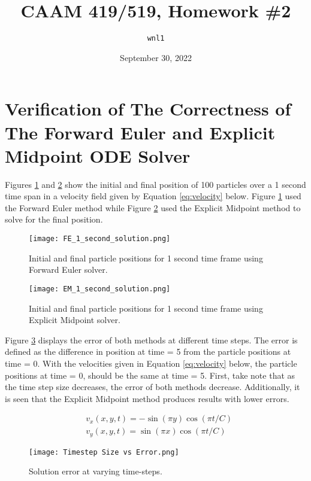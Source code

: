\documentclass{article}
\title{CAAM 419/519, Homework \#2}
\author{\texttt{wnl1}}
\date{September 30, 2022}
\begin{document}
\maketitle

\section{Verification of The Correctness of The Forward Euler and Explicit Midpoint ODE Solver}

Figures \ref{fig:FE1} and \ref{fig:EM1} show the initial and final position of 100 particles over a 1 second time span in a velocity field given by Equation \ref{eq:velocity} below. Figure \ref{fig:FE1} used the Forward Euler method while Figure \ref{fig:EM1} used the Explicit Midpoint method to solve for the final position.

\begin{figure}[h!]
  \centering
  \texttt{[image: FE\_1\_second\_solution.png]}
  \caption{Initial and final particle positions for 1 second time frame using Forward Euler solver.}
  \label{fig:FE1}
\end{figure}

\begin{figure}[h!]
  \centering
  \texttt{[image: EM\_1\_second\_solution.png]}
  \caption{Initial and final particle positions for 1 second time frame using Explicit Midpoint solver.}
  \label{fig:EM1}
\end{figure}

Figure \ref{fig:EvT} displays the error of both methods at different time steps. The error is defined as the difference in position at time = 5 from the particle positions at time = 0. With the velocities given in Equation \ref{eq:velocity} below, the particle positions at time = 0, should be the same at time = 5. First, take note that as the time step size decreases, the error of both methods decrease. Additionally, it is seen that the Explicit Midpoint method produces results with lower errors.

\begin{equation*}
  \label{eq:velocity}
  \begin{split}
    & v_x(x, y, t) = -\sin (\pi y) \cos (\pi t/C) \\
    & v_y(x, y, t) = \sin (\pi x) \cos (\pi t/C)
  \end{split}
\end{equation*}

\begin{figure}[h!]
  \centering
  \texttt{[image: Timestep Size vs Error.png]}
  \caption{Solution error at varying time-steps.}
  \label{fig:EvT}
\end{figure}
\end{document}
